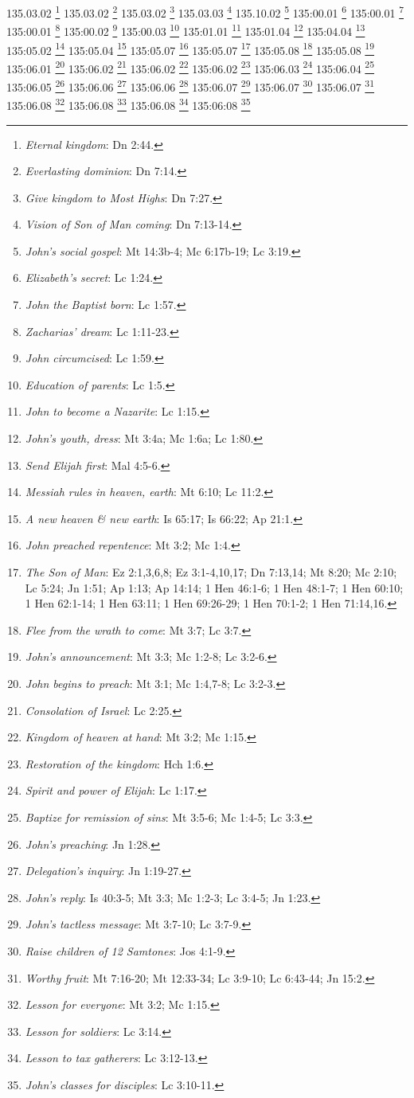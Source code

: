 {{{{{{{{{{{{{{{{{{{{{{{{{{{{{{{{{135.03.02 \footnote{\textit{Eternal kingdom}: Dn 2:44.}
135.03.02 \footnote{\textit{Everlasting dominion}: Dn 7:14.}
135.03.02 \footnote{\textit{Give kingdom to Most Highs}: Dn 7:27.}
135.03.03 \footnote{\textit{Vision of Son of Man coming}: Dn 7:13-14.}
135.10.02 \footnote{\textit{John's social gospel}: Mt 14:3b-4; Mc 6:17b-19; Lc 3:19.}
135:00.01 \footnote{\textit{Elizabeth's secret}: Lc 1:24.}
135:00.01 \footnote{\textit{John the Baptist born}: Lc 1:57.}
135:00.01 \footnote{\textit{Zacharias' dream}: Lc 1:11-23.}
135:00.02 \footnote{\textit{John circumcised}: Lc 1:59.}
135:00.03 \footnote{\textit{Education of parents}: Lc 1:5.}
135:01.01 \footnote{\textit{John to become a Nazarite}: Lc 1:15.}
135:01.04 \footnote{\textit{John's youth, dress}: Mt 3:4a; Mc 1:6a; Lc 1:80.}
135:04.04 \footnote{\textit{Send Elijah first}: Mal 4:5-6.}
135:05.02 \footnote{\textit{Messiah rules in heaven, earth}: Mt 6:10; Lc 11:2.}
135:05.04 \footnote{\textit{A new heaven & new earth}: Is 65:17; Is 66:22; Ap 21:1.}
135:05.07 \footnote{\textit{John preached repentence}: Mt 3:2; Mc 1:4.}
135:05.07 \footnote{\textit{The Son of Man}: Ez 2:1,3,6,8; Ez 3:1-4,10,17; Dn 7:13,14; Mt 8:20; Mc 2:10; Lc 5:24; Jn 1:51; Ap 1:13; Ap 14:14; 1 Hen 46:1-6; 1 Hen 48:1-7; 1 Hen 60:10; 1 Hen 62:1-14; 1 Hen 63:11; 1 Hen 69:26-29; 1 Hen 70:1-2; 1 Hen 71:14,16.}
135:05.08 \footnote{\textit{Flee from the wrath to come}: Mt 3:7; Lc 3:7.}
135:05.08 \footnote{\textit{John's announcement}: Mt 3:3; Mc 1:2-8; Lc 3:2-6.}
135:06.01 \footnote{\textit{John begins to preach}: Mt 3:1; Mc 1:4,7-8; Lc 3:2-3.}
135:06.02 \footnote{\textit{Consolation of Israel}: Lc 2:25.}
135:06.02 \footnote{\textit{Kingdom of heaven at hand}: Mt 3:2; Mc 1:15.}
135:06.02 \footnote{\textit{Restoration of the kingdom}: Hch 1:6.}
135:06.03 \footnote{\textit{Spirit and power of Elijah}: Lc 1:17.}
135:06.04 \footnote{\textit{Baptize for remission of sins}: Mt 3:5-6; Mc 1:4-5; Lc 3:3.}
135:06.05 \footnote{\textit{John's preaching}: Jn 1:28.}
135:06.06 \footnote{\textit{Delegation's inquiry}: Jn 1:19-27.}
135:06.06 \footnote{\textit{John's reply}: Is 40:3-5; Mt 3:3; Mc 1:2-3; Lc 3:4-5; Jn 1:23.}
135:06.07 \footnote{\textit{John's tactless message}: Mt 3:7-10; Lc 3:7-9.}
135:06.07 \footnote{\textit{Raise children of 12 Samtones}: Jos 4:1-9.}
135:06.07 \footnote{\textit{Worthy fruit}: Mt 7:16-20; Mt 12:33-34; Lc 3:9-10; Lc 6:43-44; Jn 15:2.}
135:06.08 \footnote{\textit{Lesson for everyone}: Mt 3:2; Mc 1:15.}
135:06.08 \footnote{\textit{Lesson for soldiers}: Lc 3:14.}
135:06.08 \footnote{\textit{Lesson to tax gatherers}: Lc 3:12-13.}
135:06:08 \footnote{\textit{John's classes for disciples}: Lc 3:10-11.}
}}}}}}}}}}}}}}}}}}}}}}}}}}}}}}}}}
